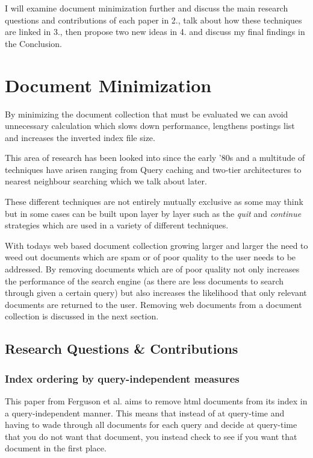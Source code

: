 \documentclass{acm_proc_article-sp}
\begin{document}
I will examine document minimization further and discuss the main research questions and contributions of each paper in 2., talk about how these techniques are linked in 3., then propose two new ideas in 4. and discuss my final findings in the Conclusion.

\section{Document Minimization}

By minimizing the document collection that must be evaluated we can avoid unnecessary calculation which slows down performance, lengthens postings list and increases the inverted index file size.

This area of research has been looked into since the early '80s and a multitude of techniques have arisen ranging from Query caching \cite{Lempel:2003} and two-tier architectures \cite{Fagni:2006} to nearest neighbour searching \cite{Smeaton:1981} which we talk about later.

These different techniques are not entirely mutually exclusive as some may think but in some cases can be built upon layer by layer such as the \emph{quit} and \emph{continue} strategies \cite{Moffat:1996} which are used in a variety of different techniques. 

With todays web based document collection growing larger and larger the need to weed out documents which are spam or of poor quality to the user needs to be addressed. By removing documents which are of poor quality not only increases the performance of the search engine (as there are less documents to search through given a certain query) but also increases the likelihood that only relevant documents are returned to the user. Removing web documents from a document collection is discussed in the next section.

\subsection{Research Questions \& Contributions}
\subsubsection{Index ordering by query-independent measures}
This paper from Ferguson et al. aims to remove html documents from its index in a query-independent manner. This means that instead of at query-time and having to wade through all documents for each query and decide at query-time that you do not want that document, you instead check to see if you want that document in the first place. 
\end{document}
